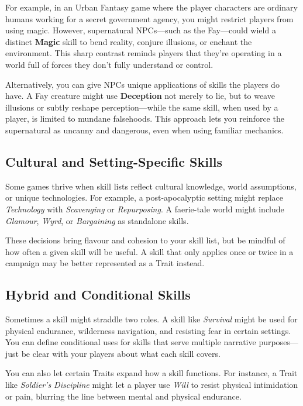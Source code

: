 For example, in an Urban Fantasy game where the player characters are ordinary humans working for a secret government agency, you might restrict players from using magic. However, supernatural NPCs—such as the Fay—could wield a distinct \textbf{Magic} skill to bend reality, conjure illusions, or enchant the environment. This sharp contrast reminds players that they're operating in a world full of forces they don’t fully understand or control.
    
Alternatively, you can give NPCs unique applications of skills the players do have. A Fay creature might use \textbf{Deception} not merely to lie, but to weave illusions or subtly reshape perception—while the same skill, when used by a player, is limited to mundane falsehoods. This approach lets you reinforce the supernatural as uncanny and dangerous, even when using familiar mechanics.

\subsection{Cultural and Setting-Specific Skills}
Some games thrive when skill lists reflect cultural knowledge, world assumptions, or unique technologies. For example, a post-apocalyptic setting might replace \textit{Technology} with \textit{Scavenging} or \textit{Repurposing}. A faerie-tale world might include \textit{Glamour}, \textit{Wyrd}, or \textit{Bargaining} as standalone skills.

These decisions bring flavour and cohesion to your skill list, but be mindful of how often a given skill will be useful. A skill that only applies once or twice in a campaign may be better represented as a Trait instead.

\subsection{Hybrid and Conditional Skills}
Sometimes a skill might straddle two roles. A skill like \textit{Survival} might be used for physical endurance, wilderness navigation, and resisting fear in certain settings. You can define conditional uses for skills that serve multiple narrative purposes—just be clear with your players about what each skill covers.

You can also let certain Traits expand how a skill functions. For instance, a Trait like \textit{Soldier’s Discipline} might let a player use \textit{Will} to resist physical intimidation or pain, blurring the line between mental and physical endurance.

